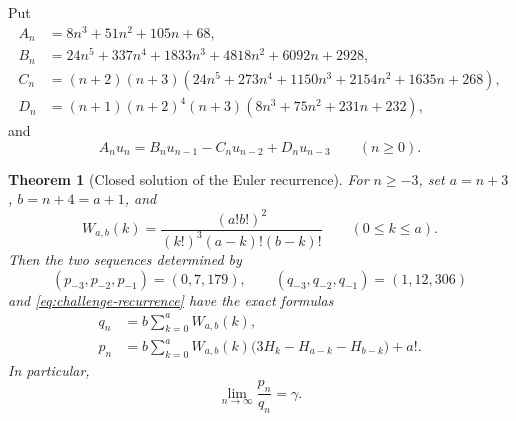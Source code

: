 \documentclass[11pt]{article}
\newtheorem{theorem}{Theorem}[section]
\theoremstyle{definition}
\theoremstyle{remark}
\begin{document}
Put
\begin{align*}
 A_n&=8n^3+51n^2+105n+68,\\
 B_n&=24n^5+337n^4+1833n^3+4818n^2+6092n+2928,\\
 C_n&=(n+2)(n+3)
 (24n^5+273n^4+1150n^3+2154n^2+1635n+268),\\
 D_n&=(n+1)(n+2)^4(n+3)
 (8n^3+75n^2+231n+232),
\end{align*}
and
\begin{equation}\label{eq:challenge-recurrence}
 A_nu_n=B_nu_{n-1}-C_nu_{n-2}+D_nu_{n-3}
 \qquad(n\ge0).
\end{equation}

\begin{theorem}[Closed solution of the Euler recurrence]
\label{thm:challenge-solution}
For \(n\ge-3\), set \(a=n+3\), \(b=n+4=a+1\), and
\begin{equation}\label{eq:Wab}
 W_{a,b}(k)=
 \frac{(a!b!)^2}{(k!)^3(a-k)!(b-k)!}
 \qquad(0\le k\le a).
\end{equation}
Then the two sequences determined by
\[
 (p_{-3},p_{-2},p_{-1})=(0,7,179),
 \qquad
 (q_{-3},q_{-2},q_{-1})=(1,12,306)
\]
and \eqref{eq:challenge-recurrence} have the exact formulas
\begin{align}
 q_n&=b\sum_{k=0}^{a}W_{a,b}(k),
 \label{eq:qn-closed}\\
 p_n&=b\sum_{k=0}^{a}W_{a,b}(k)
 \bigl(3H_k-H_{a-k}-H_{b-k}\bigr)+a!.
 \label{eq:pn-closed}
\end{align}
In particular,
\begin{equation}\label{eq:challenge-limit}
 \boxed{\displaystyle\lim_{n\to\infty}\frac{p_n}{q_n}=\gamma.}
\end{equation}
\end{theorem}
\end{document}
